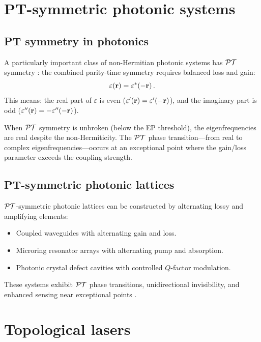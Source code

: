 \section{PT-symmetric photonic systems}
\label{sec:ch17-pt}

\subsection{PT symmetry in photonics}
\label{sec:ch17-pt-photonics}

A particularly important class of non-Hermitian photonic systems has
$\mathcal{PT}$ symmetry \cite{longhi2018parity}: the combined parity-time
symmetry requires balanced loss and gain:
\begin{equation}\label{eq:ch17-pt-condition}
  \varepsilon(\mathbf{r}) = \varepsilon^*(-\mathbf{r})\,.
\end{equation}
This means: the real part of $\varepsilon$ is even ($\varepsilon'(\mathbf{r})
=\varepsilon'(-\mathbf{r})$), and the imaginary part is odd
($\varepsilon''(\mathbf{r})=-\varepsilon''(-\mathbf{r})$).

When $\mathcal{PT}$ symmetry is unbroken (below the EP threshold), the
eigenfrequencies are real despite the non-Hermiticity.  The $\mathcal{PT}$ phase
transition---from real to complex eigenfrequencies---occurs at an
exceptional point where the gain/loss parameter exceeds the coupling
strength.

\subsection{PT-symmetric photonic lattices}
\label{sec:ch17-pt-lattices}

$\mathcal{PT}$-symmetric photonic lattices can be constructed by alternating
lossy and amplifying elements:
\begin{itemize}
  \item Coupled waveguides with alternating gain and loss.
  \item Microring resonator arrays with alternating pump and
  absorption.
  \item Photonic crystal defect cavities with controlled $Q$-factor
  modulation.
\end{itemize}
These systems exhibit $\mathcal{PT}$ phase transitions, unidirectional
invisibility, and enhanced sensing near exceptional points
\cite{ozawa2018topological}.

\section{Topological lasers}
\label{sec:ch17-lasers}

